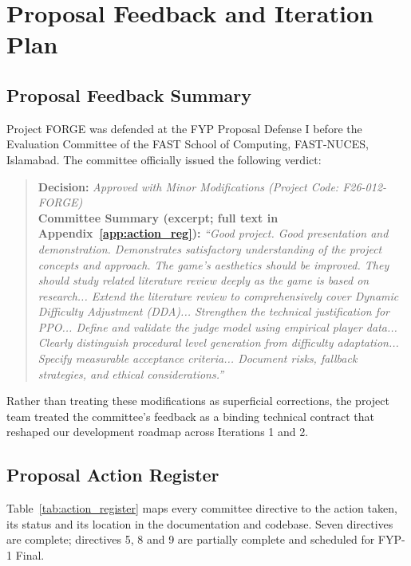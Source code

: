 \chapter{Proposal Feedback and Iteration Plan}
\label{chap:plan}

\section{Proposal Feedback Summary}
Project FORGE was defended at the FYP Proposal Defense I before the Evaluation Committee of the FAST School of Computing, FAST-NUCES, Islamabad. The committee officially issued the following verdict:
\begin{quote}
\textbf{Decision:} \textit{Approved with Minor Modifications (Project Code: F26-012-FORGE)}\\
\textbf{Committee Summary (excerpt; full text in Appendix~\ref{app:action_reg}):} \textit{``Good project. Good presentation and demonstration. Demonstrates satisfactory understanding of the project concepts and approach. The game's aesthetics should be improved. They should study related literature review deeply as the game is based on research... Extend the literature review to comprehensively cover Dynamic Difficulty Adjustment (DDA)... Strengthen the technical justification for PPO... Define and validate the judge model using empirical player data... Clearly distinguish procedural level generation from difficulty adaptation... Specify measurable acceptance criteria... Document risks, fallback strategies, and ethical considerations.''}
\end{quote}

Rather than treating these modifications as superficial corrections, the project team treated the committee's feedback as a binding technical contract that reshaped our development roadmap across Iterations 1 and 2.

\section{Proposal Action Register}
Table~\ref{tab:action_register} maps every committee directive to the action taken, its status and its location in the documentation and codebase. Seven directives are complete; directives 5, 8 and 9 are partially complete and scheduled for FYP-1 Final.

